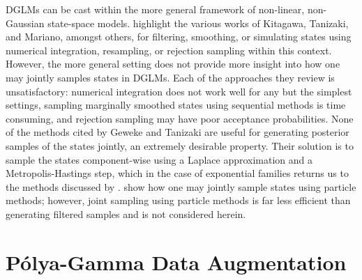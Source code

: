\documentclass[12pt]{article}
\newcommand{\Polya}{P\'{o}lya}
\begin{document}
DGLMs can be cast within the more general framework of non-linear, non-Gaussian
state-space models.  \cite{geweke-tanizaki-2001} highlight the various works of
Kitagawa, Tanizaki, and Mariano, amongst others, for filtering, smoothing, or
simulating states using numerical integration, resampling, or rejection sampling
within this context.  However, the more general setting does not provide more
insight into how one may jointly samples states in DGLMs.  Each of the
approaches they review is unsatisfactory: numerical integration does not work
well for any but the simplest settings, sampling marginally smoothed states
using sequential methods is time consuming, and rejection sampling may have poor
acceptance probabilities.  None of the methods cited by Geweke and Tanizaki are
useful for generating posterior samples of the states jointly, an extremely
desirable property.  Their solution is to sample the states component-wise using
a Laplace approximation and a Metropolis-Hastings step, which in the case of
exponential families returns us to the methods discussed by
\citep{gamerman-1998}.  \cite{godsill-etal-2004} show how one may jointly sample
states using particle methods; however, joint sampling using particle methods is
far less efficient than generating filtered samples and is not considered
herein.

\section{\Polya-Gamma Data Augmentation}
\end{document}
